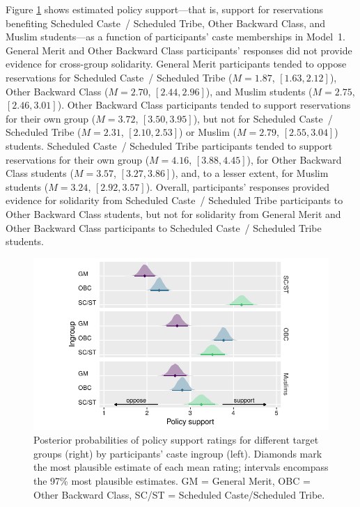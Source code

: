 \documentclass[12pt, a4paper]{article}
\begin{document}
Figure \ref{fig:ch5-s4-2} shows estimated policy support---that is, support for reservations benefiting Scheduled Caste~/ Scheduled Tribe, Other Backward Class, and Muslim students---as a function of participants' caste memberships in Model~1. General Merit and Other Backward Class participants' responses did not provide evidence for cross-group solidarity. General Merit participants tended to oppose reservations for Scheduled Caste~/ Scheduled Tribe ($M = 1.87$, $[1.63, 2.12]$), Other Backward Class ($M = 2.70$, $[2.44, 2.96]$), and Muslim students ($M = 2.75$, $[2.46, 3.01]$). Other Backward Class participants tended to support reservations for their own group ($M = 3.72$, $[3.50, 3.95]$), but not for Scheduled Caste~/ Scheduled Tribe ($M = 2.31$, $[2.10, 2.53]$) or Muslim ($M = 2.79$, $[2.55, 3.04]$) students. Scheduled Caste~/ Scheduled Tribe participants tended to support reservations for their own group ($M = 4.16$, $[3.88, 4.45]$), for Other Backward Class students ($M = 3.57$, $[3.27, 3.86]$), and, to a lesser extent, for Muslim students ($M = 3.24$, $[2.92, 3.57]$). Overall, participants' responses provided evidence for solidarity from Scheduled Caste~/ Scheduled Tribe participants to Other Backward Class students, but not for solidarity from General Merit and Other Backward Class participants to Scheduled Caste~/ Scheduled Tribe students. 

\begin{figure}
\centering
\includegraphics[scale=1]{../figures/figure-8}
\caption{
Posterior probabilities of policy support ratings for different target groups (right) by participants' caste ingroup (left). Diamonds mark the most plausible estimate of each mean rating; intervals encompass the 97\% most plausible estimates. GM = General Merit, OBC = Other Backward Class, SC/ST = Scheduled Caste/Scheduled Tribe.
}
\label{fig:ch5-s4-2}
\end{figure}
\end{document}
